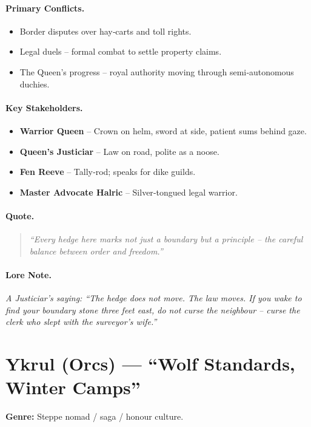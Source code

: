 \paragraph{Primary Conflicts.}
\begin{itemize}
  \item Border disputes over hay‑carts and toll rights.
  \item Legal duels – formal combat to settle property claims.
  \item The Queen’s progress – royal authority moving through semi‑autonomous duchies.
\end{itemize}

\paragraph{Key Stakeholders.}
\begin{itemize}
  \item \textbf{Warrior Queen} – Crown on helm, sword at side, patient sums behind gaze.
  \item \textbf{Queen’s Justiciar} – Law on road, polite as a noose.
  \item \textbf{Fen Reeve} – Tally‑rod; speaks for dike guilds.
  \item \textbf{Master Advocate Halric} – Silver‑tongued legal warrior.
\end{itemize}

\paragraph{Quote.}
\begin{quote}
\emph{“Every hedge here marks not just a boundary but a principle – the careful balance between order and freedom.”}
\end{quote}

\paragraph{Lore Note.}
\emph{A Justiciar’s saying: “The hedge does not move. The law moves. If you wake to find your boundary stone three feet east, do not curse the neighbour – curse the clerk who slept with the surveyor’s wife.”}

\section{Ykrul (Orcs) — “Wolf Standards, Winter Camps”}
\textbf{Genre:} Steppe nomad / saga / honour culture.

